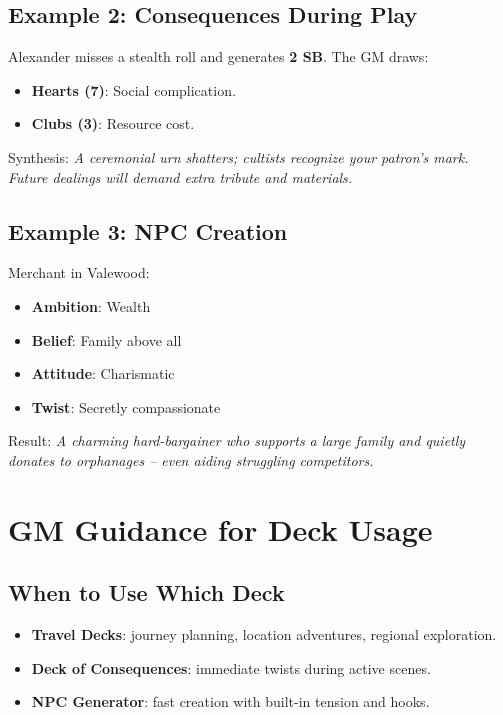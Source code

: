 \subsection{Example 2: Consequences During Play}\label{subsec:example_consequences}
Alexander misses a stealth roll and generates \textbf{2 SB}. The GM draws:
\begin{itemize}
    \item \textbf{Hearts (7)}: Social complication.
    \item \textbf{Clubs (3)}: Resource cost.
\end{itemize}
Synthesis: \emph{A ceremonial urn shatters; cultists recognize your patron's mark. Future dealings will demand extra tribute and materials.}

\subsection{Example 3: NPC Creation}\label{subsec:example_npc}
Merchant in Valewood:
\begin{itemize}
    \item \textbf{Ambition}: Wealth
    \item \textbf{Belief}: Family above all
    \item \textbf{Attitude}: Charismatic
    \item \textbf{Twist}: Secretly compassionate
\end{itemize}
Result: \emph{A charming hard-bargainer who supports a large family and quietly donates to orphanages -- even aiding struggling competitors.}

\section{GM Guidance for Deck Usage}\label{sec:deck_guidance}

\subsection{When to Use Which Deck}\label{subsec:deck_selection}
\begin{itemize}
    \item \textbf{Travel Decks}: journey planning, location adventures, regional exploration.
    \item \textbf{Deck of Consequences}: immediate twists during active scenes.
    \item \textbf{NPC Generator}: fast creation with built-in tension and hooks.
\end{itemize}

